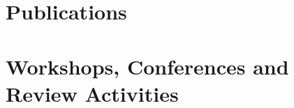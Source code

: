 \documentclass[10pt,a4paper,sans]{moderncv}
\begin{document}
\makecvtitle

\section{Publications}
\begin{refsection}[pub]
    \nocite{*}
    \printbibliography[heading=pub]
\end{refsection}


\section{Workshops, Conferences and Review Activities}


\clearpage
\end{document}
